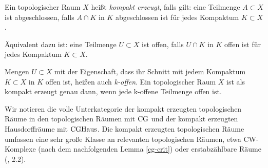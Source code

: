 \begin{defn} \label{def:cg}
  Ein topologischer Raum $X$ heißt \emph{kompakt erzeugt}, falls gilt:
  eine Teilmenge $A \subset X$ ist abgeschlossen, falls $A \cap K$ in
  $K$ abgeschlossen ist für jedes Kompaktum $K \subset X$.
\end{defn}
\begin{bem}
  Äquivalent dazu ist: eine Teilmenge $U \subset X$ ist offen, falls
  $U \cap K$ in $K$ offen ist für jedes Kompaktum $K \subset X$.
\end{bem}
Mengen $U \subset X$ mit der Eigenschaft, dass ihr Schnitt mit jedem
Kompaktum $K \subset X$ in $K$ offen ist, heißen auch
\emph{k-offen}. Ein topologischer Raum $X$ ist als kompakt erzeugt
genau dann, wenn jede k-offene Teilmenge offen ist.

Wir notieren die volle Unterkategorie der kompakt
erzeugten topologischen Räume in den topologischen Räumen mit $\operatorname{CG}$
und der kompakt erzeugten Hausdorffräume mit $\operatorname{CGHaus}$. Die kompakt
erzeugten topologischen Räume umfassen eine sehr große Klasse an
relevanten topologischen Räumen, etwa CW-Komplexe (nach dem
nachfolgenden Lemma \ref{cg-crit}) oder erstabzählbare Räume
(\cite{Steenrod}, 2.2).


